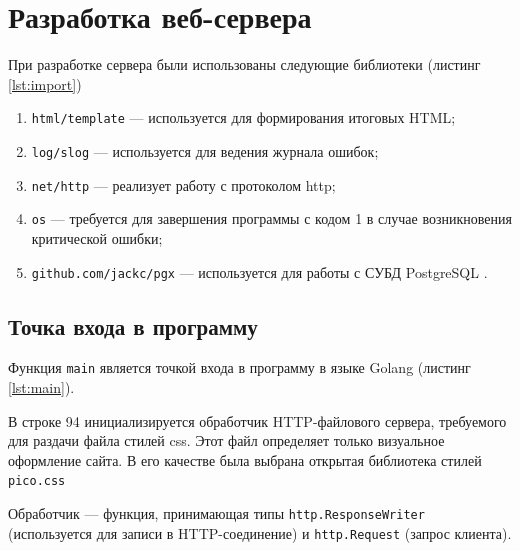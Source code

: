 \section{Разработка веб-сервера}

При разработке сервера были использованы следующие библиотеки (листинг \ref{lst:import})

\begin{listing}[H]
    \caption{Используемые библиотеки}
    \label{lst:import}
\end{listing}

\begin{enumerate}
    \item \texttt{html/template} --- используется для формирования итоговых HTML;
    \item \texttt{log/slog} --- используется для ведения журнала ошибок;
    \item \texttt{net/http} --- реализует работу с протоколом http;
    \item \texttt{os} --- требуется для завершения программы с кодом 1 в случае возникновения критической ошибки;
    \item \texttt{github.com/jackc/pgx} --- используется для работы с СУБД PostgreSQL \cite{git:pgx}.
\end{enumerate}

\subsection{Точка входа в программу}

Функция \texttt{main} является точкой входа в программу в языке Golang (листинг \ref{lst:main}).

\begin{listing}[H]
    \caption{Точка входа в программу --- функция main}
    \label{lst:main}
\end{listing}

В строке 94 инициализируется обработчик HTTP-файлового сервера, требуемого для раздачи файла стилей css.
Этот файл определяет только визуальное оформление сайта.
В его качестве была выбрана открытая библиотека стилей \texttt{pico.css} \cite{wiki:pico.css}

Обработчик --- функция, принимающая типы \texttt{http.ResponseWriter} (используется для записи в HTTP-соединение) и
\texttt{http.Request} (запрос клиента).

